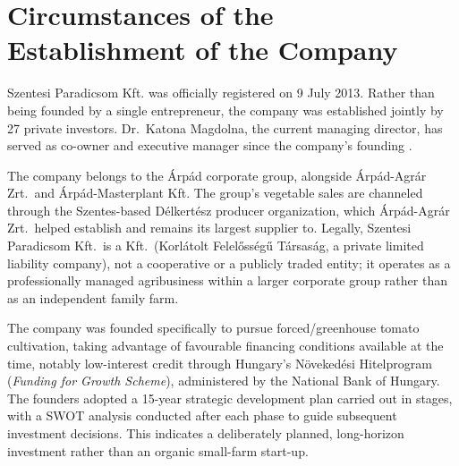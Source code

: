 %
%

\section{Circumstances of the Establishment of the Company}
Szentesi Paradicsom Kft. was officially registered on 9 July 2013. Rather than being founded by a single entrepreneur, the company was established jointly by 27 private investors. Dr.\ Katona Magdolna, the current managing director, has served as co-owner and executive manager since the company's founding \cite{szentesi_interview}.

The company belongs to the Árpád corporate group, alongside Árpád-Agrár Zrt.\ and Árpád-Masterplant Kft. The group's vegetable sales are channeled through the Szentes-based Délkertész producer organization, which Árpád-Agrár Zrt.\ helped establish and remains its largest supplier to. Legally, Szentesi Paradicsom Kft.\ is a Kft.\ (Korlátolt Felelősségű Társaság, a private limited liability company), not a cooperative or a publicly traded entity; it operates as a professionally managed agribusiness within a larger corporate group rather than as an independent family farm.

The company was founded specifically to pursue forced/greenhouse tomato cultivation, taking advantage of favourable financing conditions available at the time, notably low-interest credit through Hungary's Növekedési Hitelprogram (\emph{Funding for Growth Scheme}), administered by the National Bank of Hungary. The founders adopted a 15-year strategic development plan carried out in stages, with a SWOT analysis conducted after each phase to guide subsequent investment decisions. This indicates a deliberately planned, long-horizon investment rather than an organic small-farm start-up.

